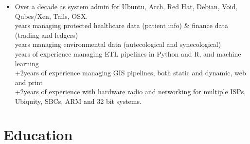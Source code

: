 \begin{itemize}
        \item Over a decade as system admin for Ubuntu, Arch, Red Hat, Debian, Void, Qubes/Xen, Tails, OSX.
        \\ \number\numexpr{}\relax\space years managing protected healthcare data (patient info) \& finance data (trading and ledgers)
        \\ \number\numexpr{}\relax\space years managing environmental data (autecological and synecological) 
        \\ \number\numexpr{}\relax\space years of experience managing ETL pipelines in Python and R, and machine learning
        \\ \number{}+2\relax\space years of experience managing GIS pipelines, both static and dynamic, web and print
        \\ \number{}+2\relax\space years of experience with hardware radio and networking for multiple ISPs, Ubiquity, SBCs, ARM and 32 bit systems.
    \end{itemize}

\section{Education}
\begin{exptable}
\end{exptable}